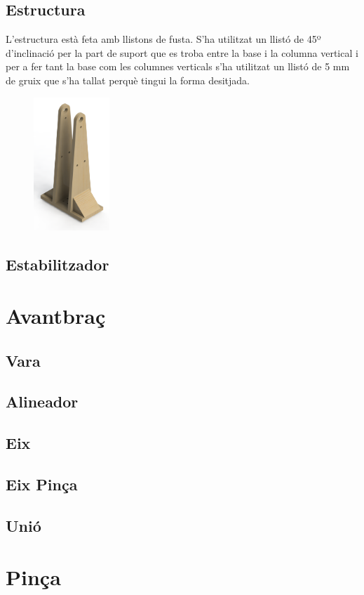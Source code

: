 \documentclass[a4paper, 10pt]{article}
\begin{document}
\subsection{Estructura}
\begin{flushleft}
L'estructura està feta amb llistons de fusta. S'ha utilitzat un llistó de 45º d'inclinació per la part de suport que es troba entre la base i la columna vertical i per a fer tant la base com les columnes verticals s'ha utilitzat un llistó de 5 mm de gruix que s'ha tallat perquè tingui la forma desitjada. 
\end{flushleft}

\begin{figure}[h!]
\centering
\includegraphics[height=5cm]{./images/estructura}
\end{figure}

\subsection{Estabilitzador}

\newpage
\section{Avantbraç}

\subsection{Vara}

\subsection{Alineador}

\subsection{Eix}

\subsection{Eix Pinça}

\subsection{Unió}

\newpage
\section{Pinça}
\end{document}
